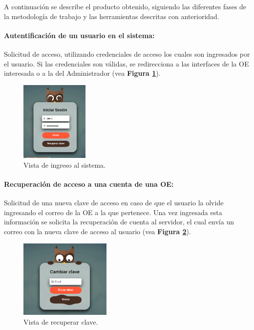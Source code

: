 A continuación se describe el producto obtenido, siguiendo las diferentes fases de la metodología de trabajo y las herramientas descritas con anterioridad.

\paragraph{Autentificación de un usuario en el sistema: } Solicitud de acceso, utilizando credenciales de acceso los cuales son ingresados por el usuario. Si las credenciales son válidas, se redirecciona a las interfaces de la OE interesada o a la del Administrador (vea \textbf{Figura \ref{fig: Login}}).

\begin{figure}[h]
    \centering
    \includegraphics[width=0.3\textwidth]{Imagenes/Login.PNG}
    \caption{\label{fig: Login}Vista de ingreso al sistema.}
\end{figure}

\paragraph{Recuperación de acceso a una cuenta de una OE: } Solicitud de una nueva clave de acceso en caso de que el usuario la olvide ingresando el correo de la OE a la que pertenece. Una vez ingresada esta información se solicita la recuperación de cuenta al servidor, el cual envía un correo con la nueva clave de acceso al usuario (vea \textbf{Figura \ref{fig: RecuperarClave}}).

\begin{figure}[h]
    \centering
    \includegraphics[width=0.4\textwidth]{Imagenes/RecuperarClave.PNG}
    \caption{\label{fig: RecuperarClave}Vista de recuperar clave.}
\end{figure}

